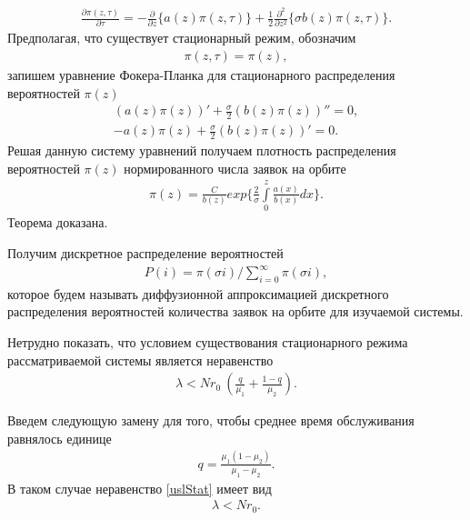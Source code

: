 \begin{align}
	\frac{\partial \pi (z,\tau)}{\partial \tau}=-\frac{\partial}{\partial z}\{a(z)\pi(z,\tau)\} 
	+\frac{1}{2}\frac{\partial^2}{\partial z^2}\{\sigma b(z)\pi(z,\tau)\}.
\end{align}
Предполагая, что существует стационарный режим, обозначим 
\begin{align}
	\pi (z,\tau)=\pi(z),
\end{align}
запишем уравнение Фокера-Планка для стационарного распределения вероятностей $\pi{(z)}$
\begin{align*}
	(a(z)\pi(z))'+\frac{\sigma}{2}(b(z)\pi(z))''=0,\\
	-a(z)\pi(z)+\frac{\sigma}{2}(b(z)\pi(z))'=0.
\end{align*}
Решая данную систему уравнений получаем плотность распределения вероятностей $\pi{(z)}$ нормированного числа заявок на орбите
\begin{align}
	\pi (z)= \frac{C}{b(z)}exp\bigg\{\frac{2}{\sigma} \int\limits_0^z \frac{a(x)}{b(x)}dx\bigg\}.
\end{align} 
Теорема доказана.

Получим дискретное распределение вероятностей
\begin{align}
	P(i)=\pi(\sigma i)/\sum\limits_{i=0}^{\infty} \pi(\sigma i),
\end{align} 
которое будем называть диффузионной аппроксимацией дискретного распределения вероятностей количества заявок на орбите для изучаемой системы.


Нетрудно показать, что условием существования стационарного
режима рассматриваемой системы является неравенство 
\begin{align}\label{uslStat}
	\lambda<Nr_{0}\ (\frac{q}{\mu_{1}}+\frac{1-q}{\mu_{2}}).
\end{align}

Введем следующую замену для того, чтобы среднее время обслуживания равнялось единице
\begin{align*}
	q=\frac{\mu_{1}(1-\mu_{2})}{\mu_{1}-\mu_{2}}.
\end{align*}
В таком случае неравенство \eqref{uslStat} имеет вид
\begin{align*}
	\lambda<Nr_{0}.
\end{align*}